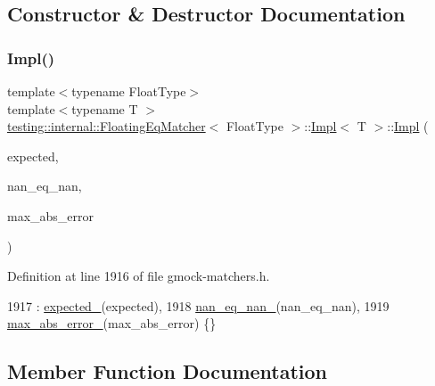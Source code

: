 \subsection{Constructor \& Destructor Documentation}
\mbox{\label{classtesting_1_1internal_1_1FloatingEqMatcher_1_1Impl_a314057e171f872ad478b3e143121aecd}} 
\subsubsection{\texorpdfstring{Impl()}{Impl()}}
{\footnotesize\ttfamily template$<$typename Float\+Type$>$ \\
template$<$typename T $>$ \\
\hyperlink{classtesting_1_1internal_1_1FloatingEqMatcher}{testing\+::internal\+::\+Floating\+Eq\+Matcher}$<$ Float\+Type $>$\+::\hyperlink{classtesting_1_1internal_1_1FloatingEqMatcher_1_1Impl}{Impl}$<$ T $>$\+::\hyperlink{classtesting_1_1internal_1_1FloatingEqMatcher_1_1Impl}{Impl} (\begin{DoxyParamCaption}\item[{Float\+Type}]{expected,  }\item[{\hyperlink{classbool}{bool}}]{nan\+\_\+eq\+\_\+nan,  }\item[{Float\+Type}]{max\+\_\+abs\+\_\+error }\end{DoxyParamCaption})\hspace{0.3cm}{\ttfamily [inline]}}



Definition at line 1916 of file gmock-\/matchers.\+h.


\begin{DoxyCode}
1917         : \hyperlink{classtesting_1_1internal_1_1FloatingEqMatcher_1_1Impl_ab7d6c6eed79e4bd83fc3758bb53395eb}{expected\_}(expected),
1918           \hyperlink{classtesting_1_1internal_1_1FloatingEqMatcher_1_1Impl_a77073561281e81e81ac8c870a0689e7a}{nan\_eq\_nan\_}(nan\_eq\_nan),
1919           \hyperlink{classtesting_1_1internal_1_1FloatingEqMatcher_1_1Impl_afec03a9fc571d9907979f088ff5e55e5}{max\_abs\_error\_}(max\_abs\_error) \{\}
\end{DoxyCode}


\subsection{Member Function Documentation}
\mbox{\label{classtesting_1_1internal_1_1FloatingEqMatcher_1_1Impl_a3eff238a812f4a105df1222a28f6cdbf}} 
